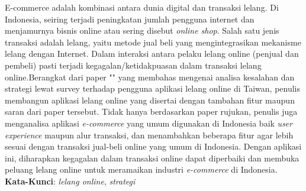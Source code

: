 \begin{abstrak}
		E-commerce adalah kombinasi antara dunia digital dan transaksi lelang. Di Indonesia, seiring terjadi peningkatan jumlah pengguna internet dan menjamurnya bisnis online atau sering disebut \textit{online shop}. Salah satu jenis transaksi adalah lelang, yaitu metode jual beli yang mengintegrasikan mekanisme lelang dengan Internet.
	    \newline
	    \indent Dalam interaksi antara pelaku lelang online (penjual dan pembeli) pasti terjadi kegagalan/ketidakpuasan dalam transaksi lelang online.Berangkat dari paper "" yang membahas mengenai analisa kesalahan dan strategi lewat survey terhadap pengguna aplikasi lelang online di Taiwan, penulis membangun aplikasi lelang online yang disertai dengan tambahan fitur maupun saran dari paper tersebut.
	    \newline 
	    \indent Tidak hanya berdasarkan paper rujukan, penulis juga menganalisa aplikasi \textit{e-commerce} yang umum digunakan di Indonesia baik \textit{user experience} maupun alur transaksi, dan menambahkan beberapa fitur agar lebih sesuai dengan transaksi jual-beli online yang umum di Indonesia. Dengan aplikasi ini, diharapkan kegagalan dalam transaksi online dapat diperbaiki dan membuka peluang lelang online untuk meramaikan industri \textit{e-commerce} di Indonesia.\\
\noindent \textbf{Kata-Kunci}: \textit{lelang online}, \textit{strategi }
\end{abstrak}